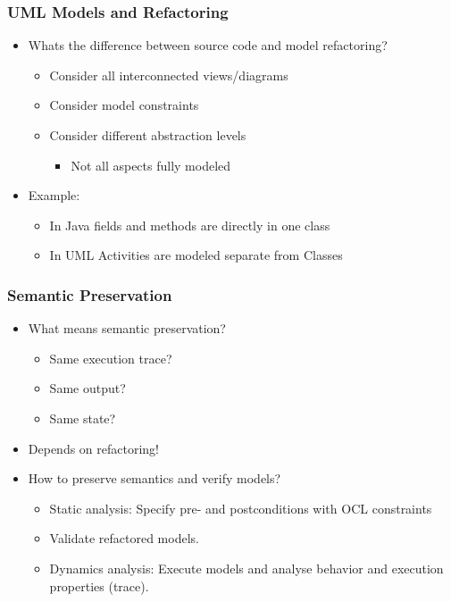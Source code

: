 \documentclass{beamer}
\begin{document}
\begin{frame}
\frametitle{UML Models and Refactoring}
\begin{itemize}
 \item Whats the difference between source code and model refactoring?
 \begin{itemize}
  \item Consider all interconnected views/diagrams
  \item Consider model constraints
  \item Consider different abstraction levels
    \begin{itemize}
	\item Not all aspects fully modeled
    \end{itemize}
 \end{itemize}
 \item Example:
\begin{itemize}
 \item In Java fields and methods are directly in one class
 \item In UML Activities are modeled separate from Classes
\end{itemize}
\end{itemize}        
\end{frame}


\begin{frame}
\frametitle{Semantic Preservation}
\begin{itemize}
 \item What means semantic preservation?
 \begin{itemize}
  \item Same execution trace?
  \item Same output?
  \item Same state?
 \end{itemize}
 \item Depends on refactoring!
 \item How to preserve semantics and verify models?
 \begin{itemize}
  \item Static analysis: Specify pre- and postconditions with OCL constraints
  \item Validate refactored models.
  \item Dynamics analysis: Execute models and analyse behavior and execution properties (trace).
 \end{itemize}
\end{itemize}
\end{frame}
\end{document}
